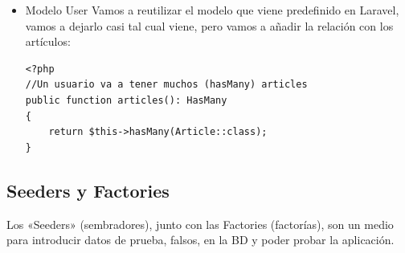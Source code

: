 \documentclass[11pt]{article}
\begin{document}
\begin{itemize}
\item Modelo User
\label{sec:orgf89cd58}
Vamos a reutilizar el modelo que viene predefinido en Laravel, vamos a
dejarlo casi tal cual viene, pero vamos a añadir la relación con los artículos:
\begin{verbatim}
<?php
//Un usuario va a tener muchos (hasMany) articles
public function articles(): HasMany
{
    return $this->hasMany(Article::class);
}
\end{verbatim}
\end{itemize}

\subsection{Seeders y Factories}
\label{sec:org144e52e}
Los «Seeders» (sembradores), junto con las Factories (factorías), son un
medio para introducir datos de prueba, falsos, en la BD y poder probar
la aplicación.
\end{document}
